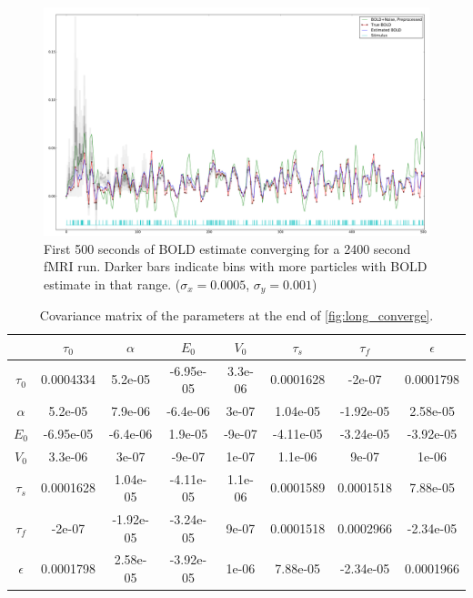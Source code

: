 \begin{figure}
\centering
\includegraphics[clip=true,trim=1cm 0cm 0cm 0cm, width=17cm]{images/long_converge_500}
\caption[First 500 seconds of the \ac{BOLD} estimate converging for a very 
long \ac{fMRI} run.]{First 500 seconds of \ac{BOLD} estimate 
converging for a 2400 second \ac{fMRI} run. Darker bars indicate
bins with more particles with \ac{BOLD} estimate in that range. ($\sigma_x = 0.0005$, $\sigma_y = 0.001$)}
\label{fig:long_converge_500}
\end{figure}

\begin{table}[t]
\begin{tabular}{|c | c  c  c  c  c  c  c |}
\hline
  & $\tau_0$ & $\alpha$ & $E_0$    & $V_0$    & $\tau_s$ & $\tau_f$ & $\epsilon$ \\
\hline
\rowcolor[gray]{.8} $\tau_0$  & 0.0004334 & 5.2e-05 & -6.95e-05 & 3.3e-06 & 0.0001628 & -2e-07 & 0.0001798 \\
$\alpha$                      & 5.2e-05 & 7.9e-06 & -6.4e-06 & 3e-07 & 1.04e-05 & -1.92e-05 & 2.58e-05 \\
\rowcolor[gray]{.8} $E_0$     & -6.95e-05 & -6.4e-06 & 1.9e-05 & -9e-07 & -4.11e-05 & -3.24e-05 & -3.92e-05 \\
$V_0$                         & 3.3e-06 & 3e-07 & -9e-07 & 1e-07 & 1.1e-06 & 9e-07 & 1e-06 \\
\rowcolor[gray]{.8} $\tau_s$  & 0.0001628 & 1.04e-05 & -4.11e-05 & 1.1e-06 & 0.0001589 & 0.0001518 & 7.88e-05 \\
$\tau_f$                      & -2e-07 & -1.92e-05 & -3.24e-05 & 9e-07 & 0.0001518 & 0.0002966 & -2.34e-05 \\
\rowcolor[gray]{.8} $\epsilon$& 0.0001798 & 2.58e-05 & -3.92e-05 & 1e-06 & 7.88e-05 & -2.34e-05 & 0.0001966 \\
\hline
\end{tabular}
\caption{Covariance matrix of the parameters at the end of \autoref{fig:long_converge}.}
\label{tab:long_cov}
\end{table}

